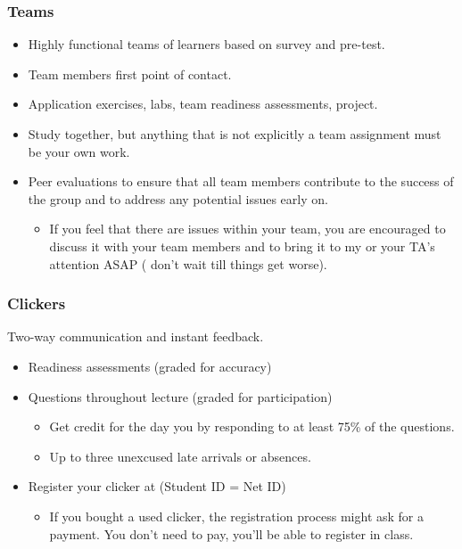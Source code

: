 \documentclass[11pt,containsverbatim,handout,xcolor=xelatex,dvipsnames,table]{beamer}
\begin{document}
\begin{frame}
\frametitle{Teams}

\begin{itemize}
\item Highly functional teams of learners based on survey and pre-test.

\item Team members first point of contact.

\item Application exercises, labs, team readiness assessments, project.

\item Study together, but anything that is not explicitly a team assignment must be 
your own work.

\item Peer evaluations to ensure that all team members contribute to the success of 
the group and to address any potential issues early on.
\begin{itemize}
\item If you feel that there are issues within your team, you are encouraged to 
discuss it with your team members and to bring it to my or your TA's attention ASAP (
don't wait till things get worse).
\end{itemize}

\end{itemize}

\end{frame}


\begin{frame}
\frametitle{Clickers}

 Two-way communication and instant feedback.

\begin{itemize}
\item Readiness assessments (graded for accuracy)

\item Questions throughout lecture (graded for participation)
\begin{itemize}
\item Get credit for the day you by responding to at least 75\% of the questions.
\item Up to three unexcused late arrivals or absences.
\end{itemize}

\item Register your clicker at  
(Student ID = Net ID)
\begin{itemize}
\item If you bought a used clicker, the registration process might ask for a payment. 
You don't need to pay, you'll be able to register in class.
\end{itemize}

\end{itemize}

\end{frame}
\end{document}
